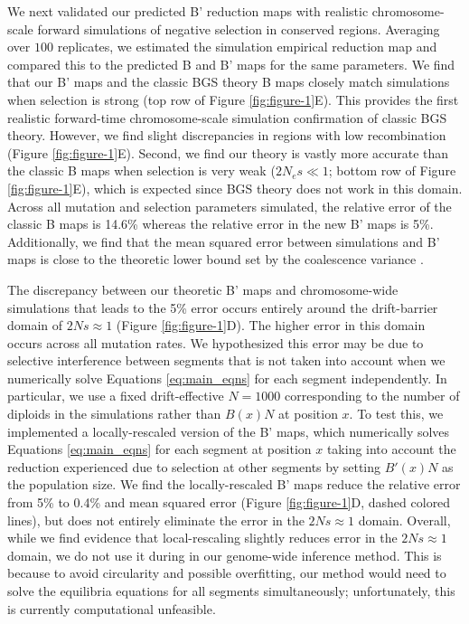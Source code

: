 \documentclass[11pt]{article}
\begin{document}
We next validated our predicted B' reduction maps with realistic
chromosome-scale forward simulations of negative selection in conserved
regions. Averaging over $100$ replicates, we estimated the simulation empirical
reduction map and compared this to the predicted B and B' maps for the same
parameters. We find that our B' maps and the classic BGS theory B maps closely
match simulations when selection is strong (top row of Figure
\ref{fig:figure-1}E). This provides the first realistic forward-time
chromosome-scale simulation confirmation of classic BGS theory. However, we
find slight discrepancies in regions with low recombination (Figure
\ref{fig:figure-1}E). Second, we find our theory is vastly more accurate than
the classic B maps when selection is very weak ($2N_e s \ll 1$; bottom row of
Figure \ref{fig:figure-1}E), which is expected since BGS theory does not work
in this domain. Across all mutation and selection parameters simulated, the
relative error of the classic B maps is 14.6\% whereas the relative error in
the new B' maps is 5\%. Additionally, we find that the mean squared error
between simulations and B' maps is close to the theoretic lower bound set by
the coalescence variance \parencite[see Methods XXX]{Tajima1983-gu}.

The discrepancy between our theoretic B' maps and chromosome-wide simulations
that leads to the 5\% error occurs entirely around the drift-barrier domain of
$2Ns \approx 1$ (Figure \ref{fig:figure-1}D). The higher error in this domain
occurs across all mutation rates. We hypothesized this error may be due to
selective interference between segments that is not taken into account when we
numerically solve Equations \eqref{eq:main_eqns} for each segment
independently. In particular, we use a fixed drift-effective $N=1000$
corresponding to the number of diploids in the simulations rather than $B(x) N$
at position $x$. To test this, we implemented a locally-rescaled version of the
B' maps, which numerically solves Equations \eqref{eq:main_eqns} for each
segment at position $x$ taking into account the reduction experienced due to
selection at other segments by setting $B'(x)N$ as the population size. We find
the locally-rescaled B' maps reduce the relative error from 5\% to 0.4\% and
mean squared error (Figure \ref{fig:figure-1}D, dashed colored lines), but does
not entirely eliminate the error in the $2Ns \approx 1$ domain. Overall, while
we find evidence that local-rescaling slightly reduces error in the $2Ns
\approx 1$ domain, we do not use it during in our genome-wide inference method.
This is because to avoid circularity and possible overfitting, our method would
need to solve the equilibria equations for all segments simultaneously;
unfortunately, this is currently computational unfeasible.
\end{document}
